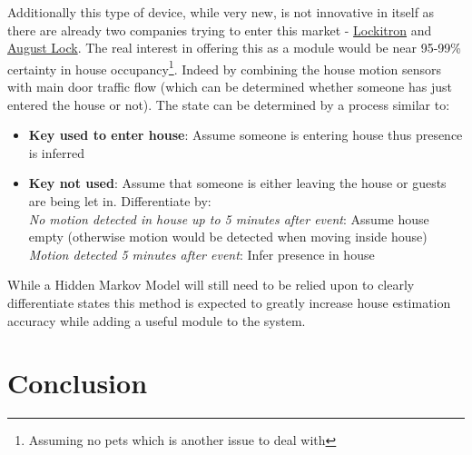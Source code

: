 \documentclass[10.5pt,a4paper,twoside]{report}   %
\let\OldSubItem\subitem
\def\subitem{\OldSubItem \hfill\vspace{-0.6cm}\\ }
\begin{document}
Additionally this type of device, while very new, is not innovative in itself as there are already two companies trying to enter this market - \href{http://lockitron.com}{Lockitron} and \href{http://www.august.com}{August Lock}. The real interest in offering this as a module would be near 95-99\% certainty in house occupancy\footnote{Assuming no pets which is another issue to deal with}. Indeed by combining the house motion sensors with main door traffic flow (which can be determined whether someone has just entered the house or not). The state can be determined by a process similar to:
\begin{itemize}
\item \textbf{Key used to enter house}: Assume someone is entering house thus presence is inferred
\item \textbf{Key not used}: Assume that someone is either leaving the house or guests are being let in. Differentiate by:
\subitem \textit{No motion detected in house up to 5 minutes after event}: Assume house empty (otherwise motion would be detected when moving inside house)
\subitem \textit{Motion detected 5 minutes after event}: Infer presence in house
\end{itemize}

While a Hidden Markov Model will still need to be relied upon to clearly differentiate states this method is expected to greatly increase house estimation accuracy while adding a useful module to the system.
\chapter{Conclusion}
\end{document}

